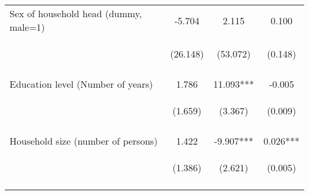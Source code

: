 \begin{center}
\begin{tabular}{lccc}
Sex of household head (dummy, male=1) & -5.704 & 2.115 & 0.100 \\
 & \begin{footnotesize}(26.148)\end{footnotesize} & \begin{footnotesize}(53.072)\end{footnotesize} & \begin{footnotesize}(0.148)\end{footnotesize} \\
\vspace{4pt} & \begin{footnotesize}[0.827]\end{footnotesize} & \begin{footnotesize}[0.968]\end{footnotesize} & \begin{footnotesize}[0.498]\end{footnotesize} \\
Education level (Number of years) & 1.786 & 11.093*** & -0.005 \\
 & \begin{footnotesize}(1.659)\end{footnotesize} & \begin{footnotesize}(3.367)\end{footnotesize} & \begin{footnotesize}(0.009)\end{footnotesize} \\
\vspace{4pt} & \begin{footnotesize}[0.282]\end{footnotesize} & \begin{footnotesize}[0.001]\end{footnotesize} & \begin{footnotesize}[0.629]\end{footnotesize} \\
Household size (number of persons) & 1.422 & -9.907*** & 0.026*** \\
 & \begin{footnotesize}(1.386)\end{footnotesize} & \begin{footnotesize}(2.621)\end{footnotesize} & \begin{footnotesize}(0.005)\end{footnotesize} \\
\vspace{4pt} & \begin{footnotesize}[0.305]\end{footnotesize} & \begin{footnotesize}[0.000]\end{footnotesize} & \begin{footnotesize}[0.000]\end{footnotesize} \\

\end{tabular}
\end{center}
